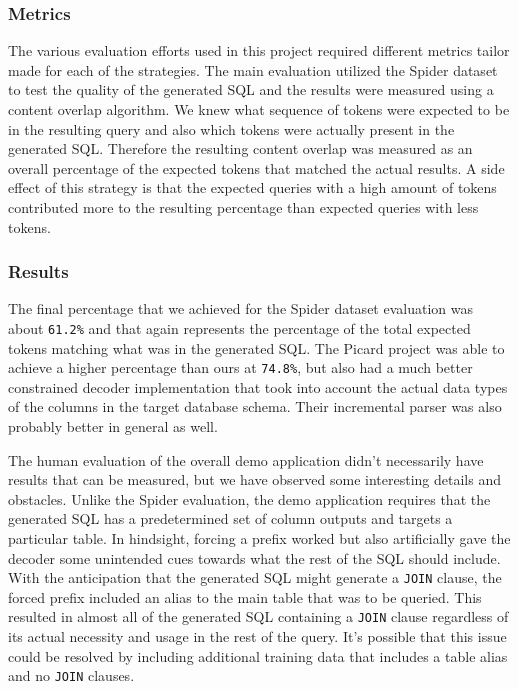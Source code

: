 \documentclass[11pt]{article}
\begin{document}
\subsubsection{Metrics}

The various evaluation efforts used in this project required different metrics tailor made for each of the strategies. The main evaluation utilized the Spider dataset to test the quality of the generated SQL and the results were measured using a content overlap algorithm. We knew what sequence of tokens were expected to be in the resulting query and also which tokens were actually present in the generated SQL. Therefore the resulting content overlap was measured as an overall percentage of the expected tokens that matched the actual results. A side effect of this strategy is that the expected queries with a high amount of tokens contributed more to the resulting percentage than expected queries with less tokens.

\subsubsection{Results}

The final percentage that we achieved for the Spider dataset evaluation was about \texttt{61.2\%} and that again represents the percentage of the total expected tokens matching what was in the generated SQL. The Picard project was able to achieve a higher percentage than ours at \texttt{74.8\%}, but also had a much better constrained decoder implementation that took into account the actual data types of the columns in the target database schema. Their incremental parser was also probably better in general as well.

The human evaluation of the overall demo application didn't necessarily have results that can be measured, but we have observed some interesting details and obstacles. Unlike the Spider evaluation, the demo application requires that the generated SQL has a predetermined set of column outputs and targets a particular table. In hindsight, forcing a prefix worked but also artificially gave the decoder some unintended cues towards what the rest of the SQL should include. With the anticipation that the generated SQL might generate a \texttt{JOIN} clause, the forced prefix included an alias to the main table that was to be queried. This resulted in almost all of the generated SQL containing a \texttt{JOIN} clause regardless of its actual necessity and usage in the rest of the query. It's possible that this issue could be resolved by including additional training data that includes a table alias and no \texttt{JOIN} clauses.
\end{document}
